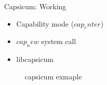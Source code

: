 \documentclass[11pt]{beamer}
\begin{document}
\begin{frame}{Capsicum: Working}
	\begin{itemize}
	\item Capability mode ($cap_enter$)
	\item $cap_new$ system call
	\item libcapsicum 
	\end{itemize}
\end{frame}

\begin{frame}
	\begin{figure}
		  \caption{capsicum exmaple}
		  
    \end{figure}  
\end{frame}
\end{document}
